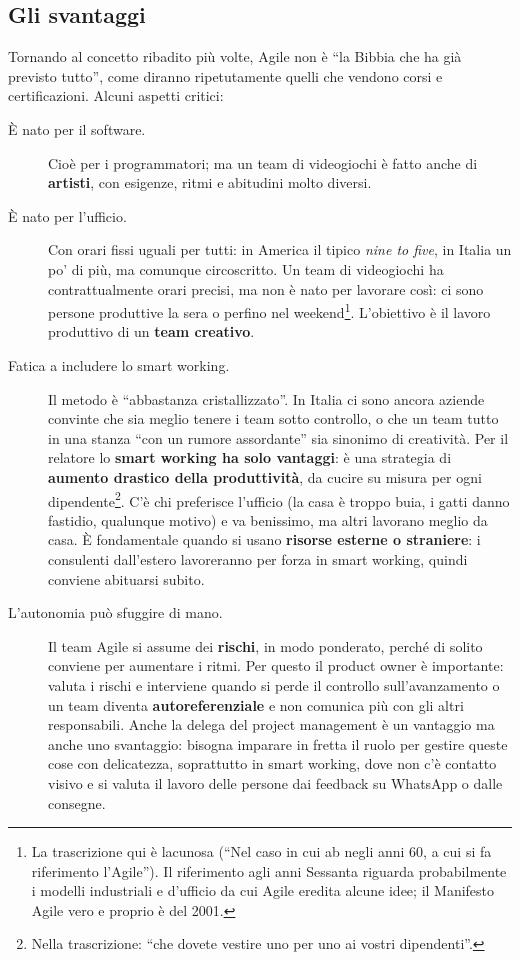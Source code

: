 \subsection{Gli svantaggi}

Tornando al concetto ribadito più volte, Agile non è ``la Bibbia che ha già
previsto tutto'', come diranno ripetutamente quelli che vendono corsi e
certificazioni. Alcuni aspetti critici:
\begin{description}
  \item[È nato per il software.] Cioè per i programmatori; ma un team di
        videogiochi è fatto anche di \textbf{artisti}, con esigenze, ritmi e
        abitudini molto diversi.
  \item[È nato per l'ufficio.] Con orari fissi uguali per tutti: in America il
        tipico \emph{nine to five}, in Italia un po' di più, ma comunque
        circoscritto. Un team di videogiochi ha contrattualmente orari precisi,
        ma non è nato per lavorare così: ci sono persone produttive la sera o
        perfino nel weekend\footnote{La trascrizione qui è lacunosa (``Nel caso in
        cui ab negli anni 60, a cui si fa riferimento l'Agile''). Il riferimento
        agli anni Sessanta riguarda probabilmente i modelli industriali e
        d'ufficio da cui Agile eredita alcune idee; il Manifesto Agile vero e
        proprio è del 2001.}. L'obiettivo è il lavoro produttivo di un
        \textbf{team creativo}.
  \item[Fatica a includere lo smart working.] Il metodo è ``abbastanza
        cristallizzato''. In Italia ci sono ancora aziende convinte che sia
        meglio tenere i team sotto controllo, o che un team tutto in una stanza
        ``con un rumore assordante'' sia sinonimo di creatività. Per il
        relatore lo \textbf{smart working ha solo vantaggi}: è una strategia di
        \textbf{aumento drastico della produttività}, da cucire su misura per
        ogni dipendente\footnote{Nella trascrizione: ``che dovete vestire uno per
        uno ai vostri dipendenti''.}. C'è chi preferisce l'ufficio (la casa è
        troppo buia, i gatti danno fastidio, qualunque motivo) e va benissimo,
        ma altri lavorano meglio da casa. È fondamentale quando si usano
        \textbf{risorse esterne o straniere}: i consulenti dall'estero
        lavoreranno per forza in smart working, quindi conviene abituarsi
        subito.
  \item[L'autonomia può sfuggire di mano.] Il team Agile si assume dei
        \textbf{rischi}, in modo ponderato, perché di solito conviene per
        aumentare i ritmi. Per questo il product owner è importante: valuta i
        rischi e interviene quando si perde il controllo sull'avanzamento o un
        team diventa \textbf{autoreferenziale} e non comunica più con gli altri
        responsabili. Anche la delega del project management è un vantaggio ma
        anche uno svantaggio: bisogna imparare in fretta il ruolo per gestire
        queste cose con delicatezza, soprattutto in smart working, dove non c'è
        contatto visivo e si valuta il lavoro delle persone dai feedback su
        WhatsApp o dalle consegne.
\end{description}

